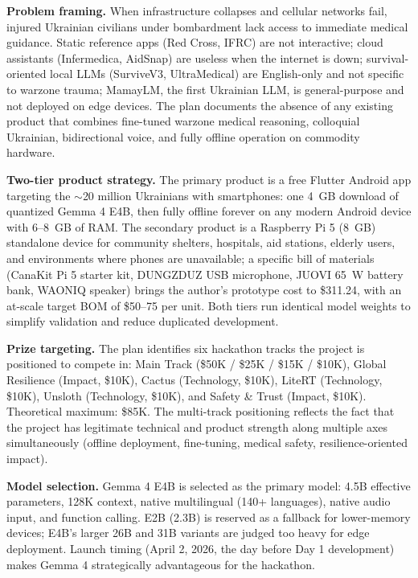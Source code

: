 \documentclass{article}
\theoremstyle{plain}
\theoremstyle{definition}
\theoremstyle{remark}
\begin{document}
\textbf{Problem framing.} When infrastructure collapses and cellular networks fail, injured Ukrainian civilians under bombardment lack access to immediate medical guidance. Static reference apps (Red Cross, IFRC) are not interactive; cloud assistants (Infermedica, AidSnap) are useless when the internet is down; survival-oriented local LLMs (SurviveV3, UltraMedical) are English-only and not specific to warzone trauma; MamayLM, the first Ukrainian LLM, is general-purpose and not deployed on edge devices. The plan documents the absence of any existing product that combines fine-tuned warzone medical reasoning, colloquial Ukrainian, bidirectional voice, and fully offline operation on commodity hardware.

\textbf{Two-tier product strategy.} The primary product is a free Flutter Android app targeting the $\sim$20 million Ukrainians with smartphones: one 4~GB download of quantized Gemma 4 E4B, then fully offline forever on any modern Android device with 6--8~GB of RAM. The secondary product is a Raspberry Pi 5 (8~GB) standalone device for community shelters, hospitals, aid stations, elderly users, and environments where phones are unavailable; a specific bill of materials (CanaKit Pi 5 starter kit, DUNGZDUZ USB microphone, JUOVI 65~W battery bank, WAONIQ speaker) brings the author's prototype cost to \$311.24, with an at-scale target BOM of \$50--75 per unit. Both tiers run identical model weights to simplify validation and reduce duplicated development.

\textbf{Prize targeting.} The plan identifies six hackathon tracks the project is positioned to compete in: Main Track (\$50K / \$25K / \$15K / \$10K), Global Resilience (Impact, \$10K), Cactus (Technology, \$10K), LiteRT (Technology, \$10K), Unsloth (Technology, \$10K), and Safety \& Trust (Impact, \$10K). Theoretical maximum: \$85K. The multi-track positioning reflects the fact that the project has legitimate technical and product strength along multiple axes simultaneously (offline deployment, fine-tuning, medical safety, resilience-oriented impact).

\textbf{Model selection.} Gemma 4 E4B is selected as the primary model: 4.5B effective parameters, 128K context, native multilingual (140+ languages), native audio input, and function calling. E2B (2.3B) is reserved as a fallback for lower-memory devices; E4B's larger 26B and 31B variants are judged too heavy for edge deployment. Launch timing (April 2, 2026, the day before Day 1 development) makes Gemma 4 strategically advantageous for the hackathon.
\end{document}

